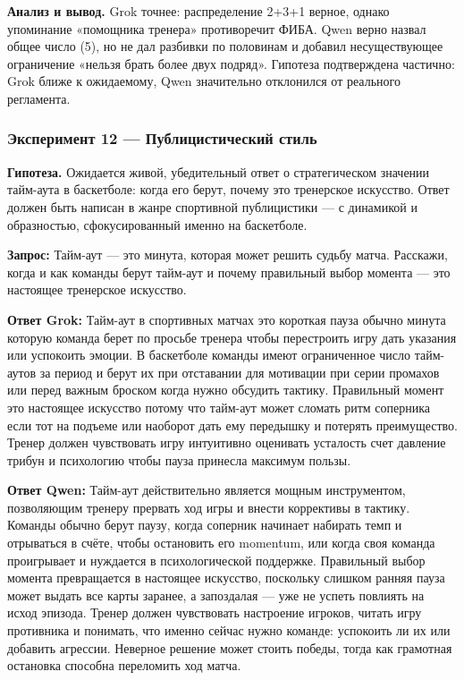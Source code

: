 \documentclass[a4paper, final]{article}
\begin{document}
\noindent\textbf{Анализ и вывод.} Grok точнее: распределение 2+3+1 верное, однако упоминание «помощника тренера» противоречит ФИБА. Qwen верно назвал общее число (5), но не дал разбивки по половинам и добавил несуществующее ограничение «нельзя брать более двух подряд». Гипотеза подтверждена частично: Grok ближе к ожидаемому, Qwen значительно отклонился от реального регламента.

\newpage

\subsubsection{Эксперимент 12 — Публицистический стиль}

\noindent\textbf{Гипотеза.} Ожидается живой, убедительный ответ о стратегическом значении тайм-аута в баскетболе: когда его берут, почему это тренерское искусство. Ответ должен быть написан в жанре спортивной публицистики — с динамикой и образностью, сфокусированный именно на баскетболе.

\noindent\textbf{Запрос:} Тайм-аут — это минута, которая может решить судьбу матча. Расскажи, когда и как команды берут тайм-аут и почему правильный выбор момента — это настоящее тренерское искусство.

\noindent\textbf{Ответ Grok:} Тайм-аут в спортивных матчах это короткая пауза обычно минута которую команда берет по просьбе тренера чтобы перестроить игру дать указания или успокоить эмоции. В баскетболе команды имеют ограниченное число тайм-аутов за период и берут их при отставании для мотивации при серии промахов или перед важным броском когда нужно обсудить тактику. Правильный момент это настоящее искусство потому что тайм-аут может сломать ритм соперника если тот на подъеме или наоборот дать ему передышку и потерять преимущество. Тренер должен чувствовать игру интуитивно оценивать усталость счет давление трибун и психологию чтобы пауза принесла максимум пользы.

\noindent\textbf{Ответ Qwen:} Тайм-аут действительно является мощным инструментом, позволяющим тренеру прервать ход игры и внести коррективы в тактику. Команды обычно берут паузу, когда соперник начинает набирать темп и отрываться в счёте, чтобы остановить его momentum, или когда своя команда проигрывает и нуждается в психологической поддержке. Правильный выбор момента превращается в настоящее искусство, поскольку слишком ранняя пауза может выдать все карты заранее, а запоздалая — уже не успеть повлиять на исход эпизода. Тренер должен чувствовать настроение игроков, читать игру противника и понимать, что именно сейчас нужно команде: успокоить ли их или добавить агрессии. Неверное решение может стоить победы, тогда как грамотная остановка способна переломить ход матча.
\end{document}
